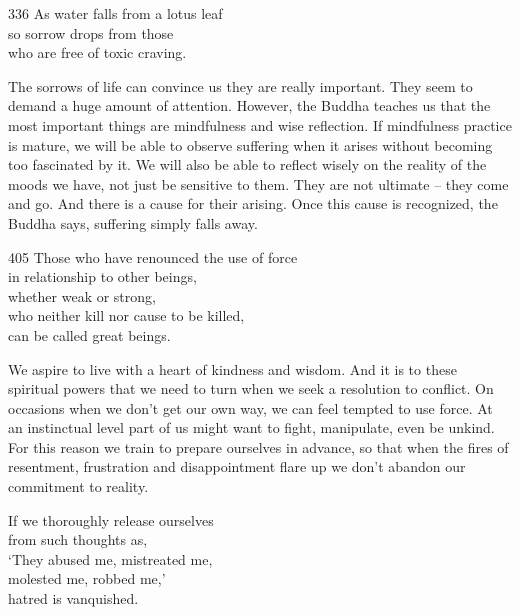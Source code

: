 
\begin{dhpVerse}{336}
\label{dhp-336}
As water falls from a lotus leaf\\
so sorrow drops from those\\
who are free of toxic craving.
\end{dhpVerse}

\begin{dhpRefl}
The sorrows of life can convince us they are really important. They seem to demand a huge amount of attention. However, the Buddha teaches us that the most important things are mindfulness and wise reflection. If mindfulness practice is mature, we will be able to observe suffering when it arises without becoming too fascinated by it. We will also be able to reflect wisely on the reality of the moods we have, not just be sensitive to them. They are not ultimate – they come and go. And there is a cause for their arising. Once this cause is recognized, the Buddha says, suffering simply falls away.
\end{dhpRefl}


\begin{dhpVerse}{405}
\label{dhp-405}
Those who have renounced the use of force\\
in relationship to other beings,\\
whether weak or strong,\\
who neither kill nor cause to be killed,\\
can be called great beings.
\end{dhpVerse}

\begin{dhpRefl}
We aspire to live with a heart of kindness and wisdom. And it is to these spiritual powers that we need to turn when we seek a resolution to conflict. On occasions when we don't get our own way, we can feel tempted to use force. At an instinctual level part of us might want to fight, manipulate, even be unkind. For this reason we train to prepare ourselves in advance, so that when the fires of resentment, frustration and disappointment flare up we don't abandon our commitment to reality.
\end{dhpRefl}


\begin{dhpVerse}{4}
\label{dhp-4}
If we thoroughly release ourselves\\
from such thoughts as,\\
`They abused me, mistreated me,\\
molested me, robbed me,'\\
hatred is vanquished.
\end{dhpVerse}

